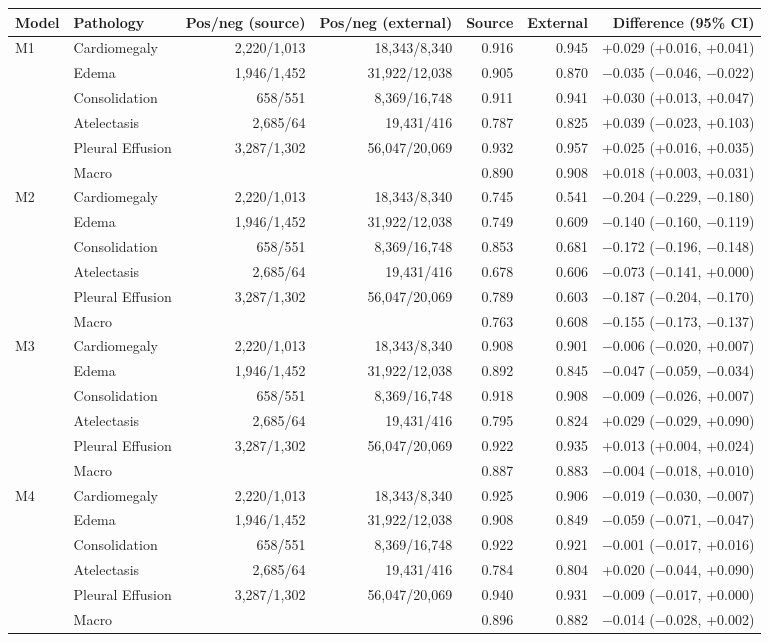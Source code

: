 \begin{tabular}{llrrrrr}
\toprule
Model & Pathology & Pos/neg (source) & Pos/neg (external) & Source & External & Difference (95\% CI)\\
\midrule
M1 & Cardiomegaly & 2,220/1,013 & 18,343/8,340 & 0.916 & 0.945 & +0.029 (+0.016, +0.041)\\
 & Edema & 1,946/1,452 & 31,922/12,038 & 0.905 & 0.870 & $-$0.035 ($-$0.046, $-$0.022)\\
 & Consolidation & 658/551 & 8,369/16,748 & 0.911 & 0.941 & +0.030 (+0.013, +0.047)\\
 & Atelectasis & 2,685/64 & 19,431/416 & 0.787 & 0.825 & +0.039 ($-$0.023, +0.103)\\
 & Pleural Effusion & 3,287/1,302 & 56,047/20,069 & 0.932 & 0.957 & +0.025 (+0.016, +0.035)\\
 & Macro & & & 0.890 & 0.908 & +0.018 (+0.003, +0.031)\\
\midrule
M2 & Cardiomegaly & 2,220/1,013 & 18,343/8,340 & 0.745 & 0.541 & $-$0.204 ($-$0.229, $-$0.180)\\
 & Edema & 1,946/1,452 & 31,922/12,038 & 0.749 & 0.609 & $-$0.140 ($-$0.160, $-$0.119)\\
 & Consolidation & 658/551 & 8,369/16,748 & 0.853 & 0.681 & $-$0.172 ($-$0.196, $-$0.148)\\
 & Atelectasis & 2,685/64 & 19,431/416 & 0.678 & 0.606 & $-$0.073 ($-$0.141, +0.000)\\
 & Pleural Effusion & 3,287/1,302 & 56,047/20,069 & 0.789 & 0.603 & $-$0.187 ($-$0.204, $-$0.170)\\
 & Macro & & & 0.763 & 0.608 & $-$0.155 ($-$0.173, $-$0.137)\\
\midrule
M3 & Cardiomegaly & 2,220/1,013 & 18,343/8,340 & 0.908 & 0.901 & $-$0.006 ($-$0.020, +0.007)\\
 & Edema & 1,946/1,452 & 31,922/12,038 & 0.892 & 0.845 & $-$0.047 ($-$0.059, $-$0.034)\\
 & Consolidation & 658/551 & 8,369/16,748 & 0.918 & 0.908 & $-$0.009 ($-$0.026, +0.007)\\
 & Atelectasis & 2,685/64 & 19,431/416 & 0.795 & 0.824 & +0.029 ($-$0.029, +0.090)\\
 & Pleural Effusion & 3,287/1,302 & 56,047/20,069 & 0.922 & 0.935 & +0.013 (+0.004, +0.024)\\
 & Macro & & & 0.887 & 0.883 & $-$0.004 ($-$0.018, +0.010)\\
\midrule
M4 & Cardiomegaly & 2,220/1,013 & 18,343/8,340 & 0.925 & 0.906 & $-$0.019 ($-$0.030, $-$0.007)\\
 & Edema & 1,946/1,452 & 31,922/12,038 & 0.908 & 0.849 & $-$0.059 ($-$0.071, $-$0.047)\\
 & Consolidation & 658/551 & 8,369/16,748 & 0.922 & 0.921 & $-$0.001 ($-$0.017, +0.016)\\
 & Atelectasis & 2,685/64 & 19,431/416 & 0.784 & 0.804 & +0.020 ($-$0.044, +0.090)\\
 & Pleural Effusion & 3,287/1,302 & 56,047/20,069 & 0.940 & 0.931 & $-$0.009 ($-$0.017, +0.000)\\
 & Macro & & & 0.896 & 0.882 & $-$0.014 ($-$0.028, +0.002)\\
\bottomrule
\end{tabular}
